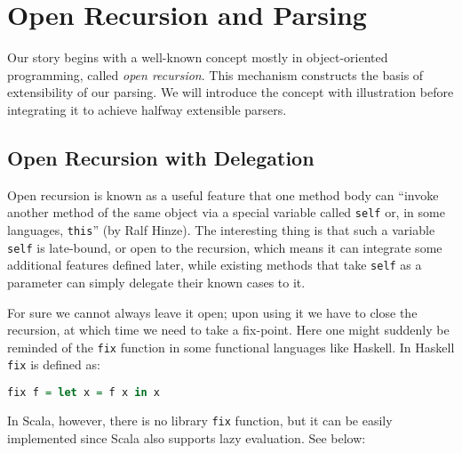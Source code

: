 \section{Open Recursion and Parsing}\label{sec:openandparsing}

Our story begins with a well-known concept mostly in object-oriented programming, called \textit{open recursion}. This mechanism
constructs the basis of extensibility of our parsing. We will introduce the concept with illustration before integrating
it  to achieve halfway extensible parsers.

\subsection{Open Recursion with Delegation}\label{subsec:openrecursion}

Open recursion is known as a useful feature that one method body can ``invoke another method of the same object via a special variable called \lstinline{self} or, in some languages, \lstinline[keywords={}]{this}'' (by Ralf Hinze). The interesting thing is that such a variable \lstinline{self} is late-bound, or open to the recursion, which means it can integrate some additional features defined later, while existing methods that take \lstinline{self} as a parameter can simply delegate their known cases to it.

For sure we cannot always leave it open; upon using it we have to close the recursion, at which time we need to take a fix-point. Here one might suddenly be reminded of the \lstinline{fix} function in some functional languages like Haskell. In Haskell \lstinline{fix} is defined as:

\begin{lstlisting}[language=Haskell,keywords={}]
fix f = let x = f x in x
\end{lstlisting}
In Scala, however, there is no library \lstinline{fix} function, but it can be easily implemented since Scala also supports lazy evaluation. See below:


